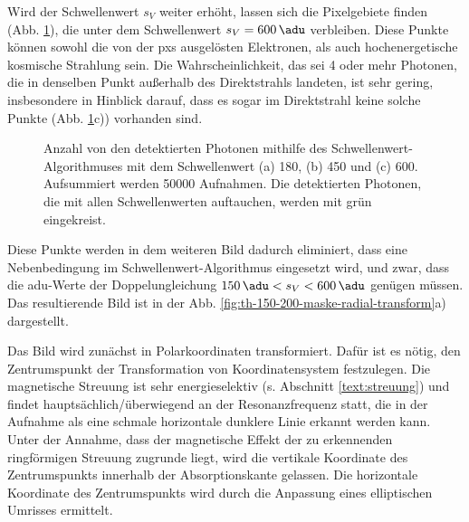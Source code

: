 \noindent
Wird der Schwellenwert $s_V$ weiter erhöht, lassen sich die Pixelgebiete finden (Abb. \ref{fig:th_180_450_600}), die unter dem Schwellenwert $s_V = \SI{600}{\adu}$ verbleiben. Diese Punkte können sowohl die von der \gls{pxs} ausgelösten Elektronen, als auch hochenergetische kosmische Strahlung sein. Die Wahrscheinlichkeit, das sei 4 oder mehr Photonen, die in denselben Punkt außerhalb des Direktstrahls landeten, ist sehr gering, insbesondere in Hinblick darauf, dass es sogar im Direktstrahl keine solche Punkte (Abb.  \ref{fig:th_180_450_600}c)) vorhanden sind.
%     
\begin{figure}[H]
    \centering
    
    \caption{Anzahl von den detektierten Photonen mithilfe des Schwellenwert-Algorithmuses mit dem Schwellenwert (a) \SI{180}{\adu}, (b) \SI{450}{\adu} und (c) \SI{600}{\adu}. Aufsummiert werden \num{50000} Aufnahmen. Die detektierten Photonen, die mit allen Schwellenwerten auftauchen, werden mit grün eingekreist.}
    \label{fig:th_180_450_600}
\end{figure}
\noindent
Diese Punkte werden in dem weiteren Bild dadurch eliminiert, dass eine Nebenbedingung im Schwellenwert-Algorithmus eingesetzt wird, und zwar, dass die \gls{adu}-Werte der Doppelungleichung $\SI{150}{\adu} < s_V < \SI{600}{\adu}$ genügen müssen. Das resultierende Bild ist in der Abb. \ref{fig:th-150-200-maske-radial-transform}a) dargestellt.

\noindent
Das Bild wird zunächst in Polarkoordinaten transformiert. Dafür ist es nötig, den Zentrumspunkt der Transformation von Koordinatensystem festzulegen. Die magnetische Streuung ist sehr energieselektiv (s. Abschnitt \ref{text:streuung}) und findet hauptsächlich/überwiegend an der Resonanzfrequenz statt, die in der Aufnahme als eine schmale horizontale dunklere Linie erkannt werden kann. Unter der Annahme, dass der magnetische Effekt der zu erkennenden ringförmigen Streuung zugrunde liegt, wird die vertikale Koordinate des Zentrumspunkts innerhalb der Absorptionskante gelassen. Die horizontale Koordinate des Zentrumspunkts wird durch die Anpassung eines elliptischen Umrisses ermittelt.

